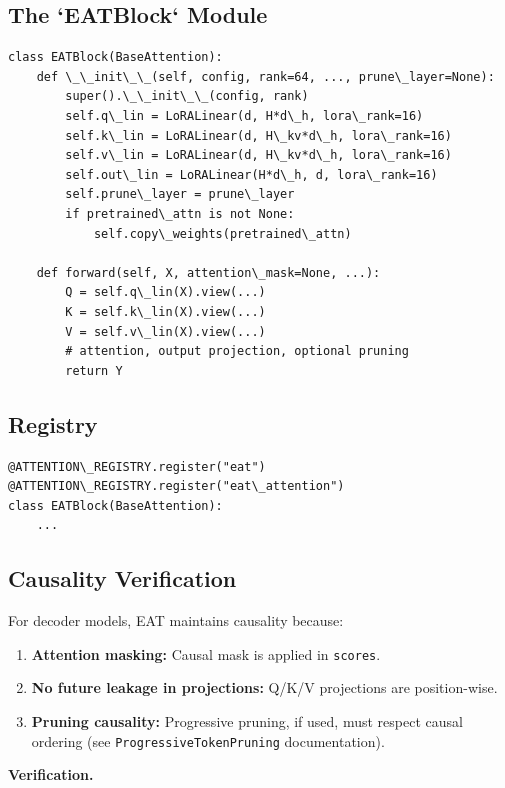 \subsection{The `EATBlock` Module}

\begin{lstlisting}
class EATBlock(BaseAttention):
    def \_\_init\_\_(self, config, rank=64, ..., prune\_layer=None):
        super().\_\_init\_\_(config, rank)
        self.q\_lin = LoRALinear(d, H*d\_h, lora\_rank=16)
        self.k\_lin = LoRALinear(d, H\_kv*d\_h, lora\_rank=16)
        self.v\_lin = LoRALinear(d, H\_kv*d\_h, lora\_rank=16)
        self.out\_lin = LoRALinear(H*d\_h, d, lora\_rank=16)
        self.prune\_layer = prune\_layer
        if pretrained\_attn is not None:
            self.copy\_weights(pretrained\_attn)
    
    def forward(self, X, attention\_mask=None, ...):
        Q = self.q\_lin(X).view(...)
        K = self.k\_lin(X).view(...)
        V = self.v\_lin(X).view(...)
        # attention, output projection, optional pruning
        return Y
\end{lstlisting}

\subsection{Registry}

\begin{lstlisting}
@ATTENTION\_REGISTRY.register("eat")
@ATTENTION\_REGISTRY.register("eat\_attention")
class EATBlock(BaseAttention):
    ...
\end{lstlisting}

\subsection{Causality Verification}

For decoder models, EAT maintains causality because:

\begin{enumerate}
\item \textbf{Attention masking:} Causal mask is applied in \texttt{scores}.
\item \textbf{No future leakage in projections:} Q/K/V projections are
  position-wise.
\item \textbf{Pruning causality:} Progressive pruning, if used, must respect
  causal ordering (see \texttt{ProgressiveTokenPruning} documentation).

\end{enumerate}
\textbf{Verification.}

